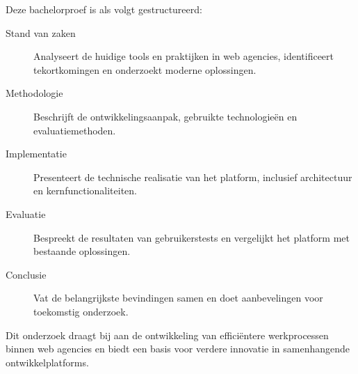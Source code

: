 Deze bachelorproef is als volgt gestructureerd:

\begin{description}
    \item[Stand van zaken] Analyseert de huidige tools en praktijken in web agencies, identificeert tekortkomingen en onderzoekt moderne oplossingen.
    
    \item[Methodologie] Beschrijft de ontwikkelingsaanpak, gebruikte technologieën en evaluatiemethoden.
    
    \item[Implementatie] Presenteert de technische realisatie van het platform, inclusief architectuur en kernfunctionaliteiten.
    
    \item[Evaluatie] Bespreekt de resultaten van gebruikerstests en vergelijkt het platform met bestaande oplossingen.
    
    \item[Conclusie] Vat de belangrijkste bevindingen samen en doet aanbevelingen voor toekomstig onderzoek.
\end{description}

Dit onderzoek draagt bij aan de ontwikkeling van efficiëntere werkprocessen binnen web agencies en biedt een basis voor verdere innovatie in samenhangende ontwikkelplatforms.